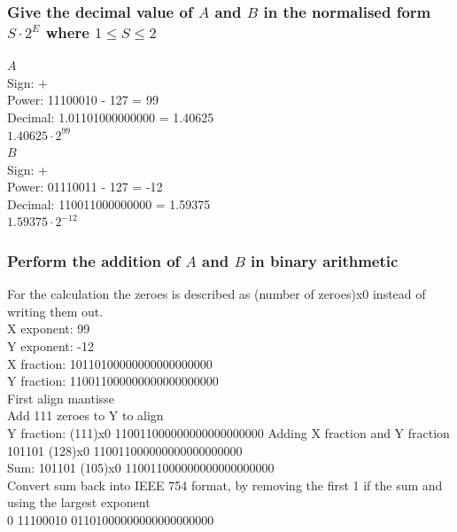 \documentclass[12pt, a4paper]{article}
\begin{document}
			\subsubsection{Give the decimal value of $A$ and $B$ in the normalised form $S\cdot 2^E$ where $1\leq S \leq 2$}
				$A$\\
				Sign: +\\
				Power: 11100010 - 127 = 99\\
				Decimal: 1.01101000000000 = 1.40625\\
				$1.40625\cdot 2^{99}$\\
				$B$\\
				Sign: +\\
				Power: 01110011 - 127 = -12\\
				Decimal: 110011000000000 = 1.59375\\
				$1.59375\cdot 2^{-12}$
			\subsubsection{Perform the addition of $A$ and $B$ in binary arithmetic}
				For the calculation the zeroes is described as (number of zeroes)x0 instead of writing them out.\\
				X exponent:  99\\
				Y exponent:  -12\\
				X fraction:  10110100000000000000000\\
				Y fraction:  110011000000000000000000\\
				First align mantisse\\
				Add 111 zeroes to Y to align\\
				Y fraction: (111)x0  110011000000000000000000
				Adding X fraction and Y fraction\\
				101101 (128)x0 110011000000000000000000\\
				Sum:  101101 (105)x0 110011000000000000000000\\
				Convert sum back into IEEE 754 format, by removing the first 1 if the sum and using the largest exponent\\
				0 11100010 01101000000000000000000
\end{document}
